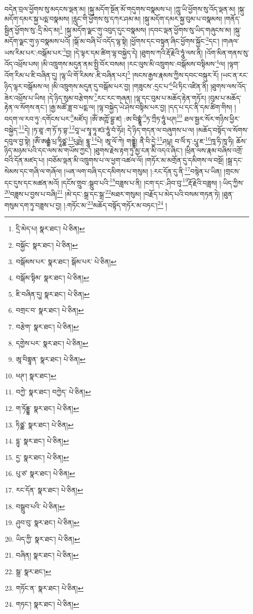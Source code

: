 བདེན་བྲལ་ཕྱོགས་སུ་མདངས་ལྡན་མ། །སྐུ་མདོག་སྔོན་མོ་གདུགས་བསྣམས་པ། །ཀླུ་ཡི་ཕྱོགས་སུ་འོད་ལྡན་མ། །སྐུ་མདོག་དམར་སྐྱ་པདྨ་བསྣམས། །རླུང་གི་ཕྱོགས་སུ་དཀར་ཤམ་མ། །སྐུ་མདོག་དམར་སྐྱ་བུམ་པ་བསྣམས། །གནོད་སྦྱིན་ཕྱོགས་སུ་:དྲི་མེད་མ།\footnote{དྲི་མེད་པ།  སྣར་ཐང་།  པེ་ཅིན། } །སྐུ་མདོག་ལྗང་གུ་འབུད་དུང་བསྣམས། །དབང་ལྡན་ཕྱོགས་སུ་ཡིད་གཞུངས་མ། །སྐུ་མདོག་ལྗང་གུ་ཉ་བསྣམས་པའོ། །སྒོ་མ་བཞི་པོ་འདོད་ལྷ་སྟེ། །ཕྱོགས་དང་བསྟུན་ཞིང་ཕྱོགས་སྐྱོང་\footnote{བསྐྱོང་  སྣར་ཐང་།  པེ་ཅིན། }དང་། །གཞལ་ཡས་རིམ་པར་:བསྒོམ་པར་\footnote{བསྒོམས་པར་  སྣར་ཐང་། སྒོམ་པར་  པེ་ཅིན། }བྱ། །དེ་ལྟར་དམ་ཚིག་ལྷ་བསྐྱེད་དེ། །ཐུགས་ཀའི་རྡོ་རྗེའི་ཧཱུཾ་ལས་ནི། །འོག་མིན་གནས་སུ་འོད་འཕྲོས་པས། །མི་འཁྲུགས་མདུན་ནམ་སྤྱི་བོར་བསམ། །རང་ལུས་མི་འཁྲུགས་:བསྒོམས་བསྟིམས་\footnote{བསྒོམ་སྟིམ་  སྣར་ཐང་།  པེ་ཅིན། }ལ། །ལྟག་འོག་རིམ་པ་ཇི་བཞིན་དུ། །ལྷ་ཡི་གོ་རིམས་:ཇི་བཞིན་པར།\footnote{ཇི་བཞིན་དུ།  སྣར་ཐང་།  པེ་ཅིན། } །སངས་རྒྱས་རྣམས་ཀྱིས་དབང་བསྐུར་རོ། །ཡང་ན་རང་ཉིད་ལྷར་བསྒོམས་ལ། །མི་འཁྲུགས་མདུན་དུ་བསྒོམ་པར་བྱ། །གཟུངས་:དྲང་པ་\footnote{བགྲང་བ་  སྣར་ཐང་།  པེ་ཅིན། }ཡི་ཏིང་འཛིན་ནི། །ཐུགས་ལས་འོད་ཟེར་འཕྲོས་པ་ཡིས། །དེ་ཉིད་སུམ་བརྩེགས་\footnote{བརྩེག་  སྣར་ཐང་།  པེ་ཅིན། }རང་རང་གཞན། །ལྷ་དང་བུམ་པ་མཆོད་རྟེན་གཏོར། །བུམ་པ་མཆོད་རྟེན་ལ་སོགས་ནང་། །རྒྱ་མཚོ་ཟླ་བ་པདྨ་ལ། །ལྷ་བསྐྱེད་ཡེ་ཤེས་བསྟིམ་པར་བྱ། །དད་པ་དང་ནི་དམ་ཚིག་གིས། །བདག་ལ་རབ་ཏུ་:དགོངས་པར་\footnote{དགྱེས་པར་  སྣར་ཐང་།  པེ་ཅིན། }མཛོད། །ཨོཾ་ཨཀྵོ་བྷྱ་ཛ། :ཨ་བིགྷྣཱཾ་\footnote{ཨཱ་བིགྷཱན་  སྣར་ཐང་།  པེ་ཅིན། }ཏ་ཀྲྀཏ་ཧཱུཾ་ཕཊ།\footnote{ཕཊ་།  སྣར་ཐང་། } ཐལ་སྦྱར་སོར་གཉིས་ཕྱིར་བསྐྱེད་\footnote{བཀྱེ་  སྣར་ཐང་། བཀྱེད་  པེ་ཅིན། }དེ། །ཏ་ཐཱ་:ག་ཏོ་ཏ་བྷ་\footnote{ག་ཏོདྡྷ་  སྣར་ཐང་།  པེ་ཅིན། }བཱ་ཡ་སྭཱ་ཧཱ་ཛཿ་ཧཱུཾ་བཾ་ཧོཿ། དེ་ཉིད་གདན་ལ་བཞུགས་པ་ལ། །མཆོད་བསྟོད་ལ་སོགས་དབུལ་བྱ་སྟེ། །ཨོཾ་ཨརྒྷཾ་པྲ་ཏཱིཙྪ་\footnote{ཏིཙྪ་  སྣར་ཐང་།  པེ་ཅིན། }པུཥྤེ། དྷཱུ་\footnote{དྷུ་  སྣར་ཐང་།  པེ་ཅིན། }པེ། ཨཱ་ལོ་ཀེ། གནྡྷེ། ནཻ་བི་དྱེ་\footnote{དྱ་  སྣར་ཐང་།  པེ་ཅིན། }ཤཔྟ། བ་ལིཾ་ཏ་:པཱུ་ཇ་\footnote{པུ་ཙ་  སྣར་ཐང་།  པེ་ཅིན། }ཁཱ་ཧི་ཁཱ་ཧི། ཆོས་ཉིད་མཉམ་པའི་དང་ལས་མ་གཡོས་ཀྱང་། །ཐུགས་རྗེས་རྟག་ཏུ་མྱ་ངན་མི་འདའ་ཞིང་། །ཕྲིན་ལས་རྣམ་བཞིས་འགྲོ་བའི་དོན་མཛད་པ། །བཅོམ་ལྡན་མི་འཁྲུགས་པ་ལ་ཕྱག་འཚལ་ལོ། །གཏོར་མ་མགྲོན་དུ་དམིགས་ལ་བསྔོ། །སྒྲ་དང་སེམས་དང་གཞི་ལ་གཞོལ། །ཡན་ལག་བཞི་དང་དམིགས་པ་གསུམ། །:རང་དོན་དུ་ནི་\footnote{རང་དོན་  སྣར་ཐང་།  པེ་ཅིན། }བསྙེན་པ་ཡིན། །གྲངས་དང་དུས་དང་མཚན་མའོ། །དངོས་གྲུབ་:སྒྲུབ་པའི་\footnote{བསྒྲུབ་པའི་  པེ་ཅིན། }བཟླས་པ་ནི། །ངག་དང་:ཤིབ་བུ་\footnote{ཤུབ་བུ་  སྣར་ཐང་།  པེ་ཅིན། }རྡོ་རྗེའི་བཟླས། །:ཡིད་ཀྱིས་\footnote{ཡིད་ཀྱི་  སྣར་ཐང་།  པེ་ཅིན། }བཟླས་པ་བྱས་པ་བཞི།\footnote{བཞིན།  སྣར་ཐང་།  པེ་ཅིན། } །མེ་དང་:སྒྲ་དང་སྒྲ་\footnote{སྒྲ་  སྣར་ཐང་། }མཐར་གསུམ། །བརྗོད་པ་མེད་པའི་བསམ་གཏན་ཏེ། །ཐུན་གསུམ་དག་ཏུ་བཟླས་པ་བྱ། །:གཏོང་མ་\footnote{གཏོང་ན་  སྣར་ཐང་།  པེ་ཅིན། }མཆོད་བསྟོད་གཏོར་མ་བཏང་།\footnote{གཏང་།  སྣར་ཐང་།  པེ་ཅིན། } །
